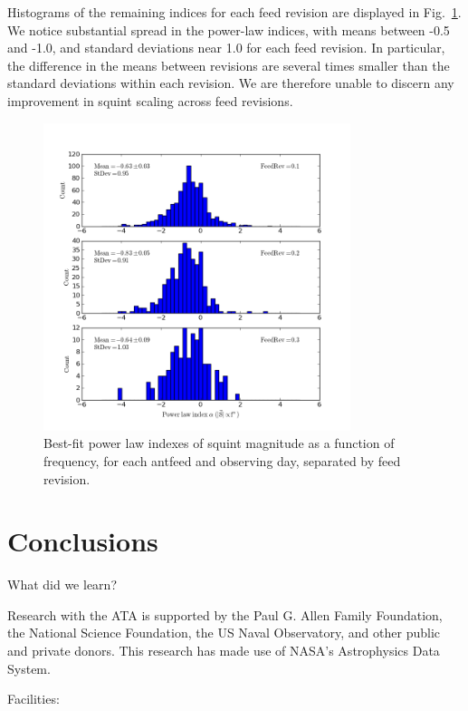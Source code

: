 \documentclass[preprint]{aastex}
\begin{document}
Histograms of the remaining indices for each feed revision are displayed in 
Fig.~\ref{fig.powerlaws}.  We notice substantial spread in the power-law 
indices, with means between -0.5 and -1.0, and standard deviations near 
1.0 for each feed revision.  In particular, the difference in the means 
between revisions are several times smaller than the standard deviations 
within each revision. We are therefore unable to discern any improvement in 
squint scaling across feed revisions.

\begin{figure}[htb]
\begin{center}
\includegraphics[width=0.8\textwidth]{images/powerlaw_rev}
\caption{Best-fit power law indexes of squint magnitude as a function
  of frequency, for each antfeed and observing day, separated by feed
  revision. \label{fig.powerlaws}}
\end{center}
\end{figure}

\section{Conclusions}\label{s.conclusions}
What did we learn?


\acknowledgments
Research with the ATA is supported by the Paul G. Allen Family
Foundation, the National Science Foundation, the US Naval Observatory,
and other public and private donors. This research has made use of
NASA's Astrophysics Data System.

Facilities: 



\end{document}
